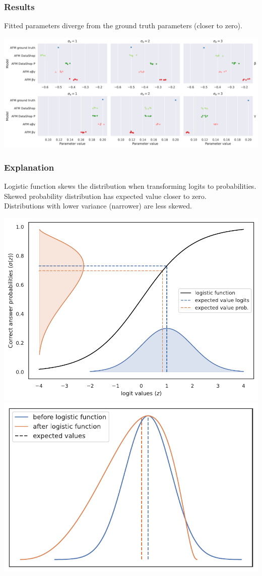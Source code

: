 \documentclass[bigger, aspectratio=169]{beamer}
\begin{document}
\begin{frame}
	\frametitle{Results}
	Fitted parameters diverge from the ground truth parameters (closer to zero).
	
	\begin{center}
		\includegraphics[width=0.99\linewidth]{figures/afm_params_comparison_both}
	\end{center}
\end{frame}


\begin{frame}
	\frametitle{Explanation}
	Logistic function skews the distribution when transforming logits to probabilities.\\
	Skewed probability distribution has expected value closer to zero.\\
	Distributions with lower variance (narrower) are less skewed.
	\begin{center}
		\includegraphics[width=0.48\linewidth]{figures/normal_sigma_skewed_n_1_1}
		\hspace*{.2em}
		\includegraphics[width=0.475\linewidth, trim = 0cm -0.8cm 0cm 0cm]{figures/distribution_shift}
  	\end{center}
\end{frame}
\end{document}
